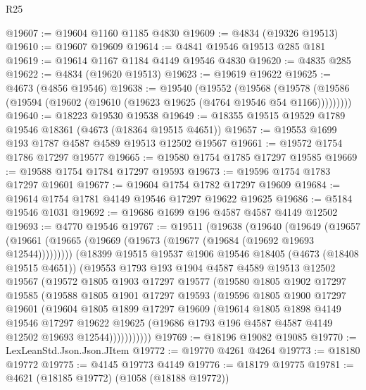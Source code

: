 \begin{lexlean}{R25}
\begin{coremodule}
@19607 := @19604 @1160 @1185 @4830
@19609 := @4834 (@19326 @19513)
@19610 := @19607 @19609
@19614 := @4841 @19546 @19513 @285 @181
@19619 := @19614 @1167 @1184 @4149 @19546 @4830
@19620 := @4835 @285
@19622 := @4834 (@19620 @19513)
@19623 := @19619 @19622
@19625 := @4673 (@4856 @19546)
@19638 := @19540
    (@19552
      (@19568
        (@19578 (@19586 (@19594 (@19602 (@19610 (@19623 @19625 (@4764 @19546 @54 @1166)))))))))
@19640 := @18223 @19530 @19538
@19649 := @18355 @19515 @19529 @1789 @19546 @18361 (@4673 (@18364 @19515 @4651))
@19657 := @19553 @1699 @193 @1787 @4587 @4589 @19513 @12502 @19567
@19661 := @19572 @1754 @1786 @17297 @19577
@19665 := @19580 @1754 @1785 @17297 @19585
@19669 := @19588 @1754 @1784 @17297 @19593
@19673 := @19596 @1754 @1783 @17297 @19601
@19677 := @19604 @1754 @1782 @17297 @19609
@19684 := @19614 @1754 @1781 @4149 @19546 @17297 @19622 @19625
@19686 := @5184 @19546 @1031
@19692 := @19686 @1699 @196 @4587 @4587 @4149 @12502
@19693 := @4770 @19546
@19767 := @19511
    (@19638
      (@19640
        (@19649
          (@19657 (@19661 (@19665 (@19669 (@19673 (@19677 (@19684 (@19692 @19693 @12544)))))))))
        (@18399
          @19515
          @19537
          @1906
          @19546
          @18405
          (@4673 (@18408 @19515 @4651))
          (@19553
            @1793
            @193
            @1904
            @4587
            @4589
            @19513
            @12502
            @19567
            (@19572
              @1805
              @1903
              @17297
              @19577
              (@19580
                @1805
                @1902
                @17297
                @19585
                (@19588
                  @1805
                  @1901
                  @17297
                  @19593
                  (@19596
                    @1805
                    @1900
                    @17297
                    @19601
                    (@19604
                      @1805
                      @1899
                      @17297
                      @19609
                      (@19614
                        @1805
                        @1898
                        @4149
                        @19546
                        @17297
                        @19622
                        @19625
                        (@19686 @1793 @196 @4587 @4587 @4149 @12502 @19693 @12544)))))))))))
@19769 := @18196 @19082 @19085
@19770 := LexLeanStd.Json.Json.JItem
@19772 := @19770 @4261 @4264
@19773 := @18180 @19772
@19775 := @4145 @19773 @4149
@19776 := @18179 @19775
@19781 := @4621 (@18185 @19772) (@1058 (@18188 @19772))

\end{coremodule}
\end{lexlean}
